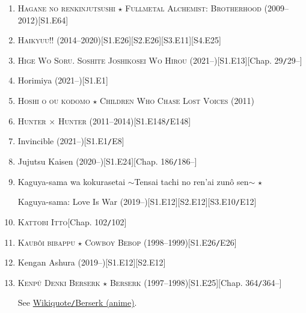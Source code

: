 \documentclass[oneside]{book}
\numberwithin{equation}{section}
\begin{document}
\begin{enumerate}
    \item \textsc{Hagane no renkinjutsushi $\star$ Fullmetal Alchemist: Brotherhood} (2009--2012)\hfill[S1.E64]
    \item \textsc{Haikyuu!!} (2014--2020)\hfill[S1.E26][S2.E26][S3.E11][S4.E25]
    \item \textsc{Hige Wo Soru. Soshite Joshikosei Wo Hirou} (2021--)\hfill[S1.E13][Chap. 29\texttt{/}29--]
    \item Horimiya (2021--)\hfill[S1.E1]
    \item \textsc{Hoshi o ou kodomo $\star$ Children Who Chase Lost Voices} (2011)
    \item \textsc{Hunter $\times$ Hunter} (2011--2014)\hfill[S1.E148\texttt{/}E148]
    \item Invincible (2021--)\hfill[S1.E1\texttt{/}E8]
    \item Jujutsu Kaisen (2020--)\hfill[S1.E24][Chap. 186\texttt{/}186--]
    \item Kaguya-sama wa kokurasetai $\sim$Tensai tachi no ren'ai zun\^o sen$\sim$ $\star$
    
    Kaguya-sama: Love Is War (2019--)\hfill[S1.E12][S2.E12][S3.E10\texttt{/}E12]
    \item \textsc{Kattobi Itto}\hfill[Chap. 102\texttt{/}102]
    \item \textsc{Kaub\^oi bibappu $\star$ Cowboy Bebop} (1998--1999)\hfill[S1.E26\texttt{/}E26]
    \item Kengan Ashura (2019--)\hfill[S1.E12][S2.E12]
    \item \textsc{Kenp\^u Denki Berserk $\star$ Berserk} (1997--1998)\hfill[S1.E25][Chap. 364\texttt{/}364--]
    
    See \href{https://en.wikiquote.org/wiki/Berserk_(anime)}{Wikiquote\texttt{/}Berserk (anime)}.
    

\end{enumerate}
\end{document}
